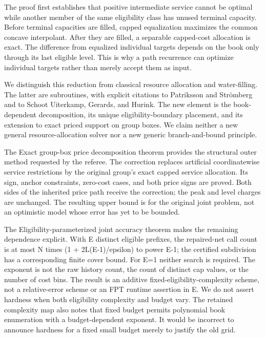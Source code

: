 \documentclass[11pt,letterpaper]{article}
\begin{document}
The proof first establishes that positive intermediate service cannot be optimal while another member of the same eligibility class has unused terminal capacity. Before terminal capacities are filled, capped equalization maximizes the common concave interpolant. After they are filled, a separable capped-cost allocation is exact. The difference from equalized individual targets depends on the book only through its last eligible level. This is why a path recurrence can optimize individual targets rather than merely accept them as input.



We distinguish this reduction from classical resource allocation and water-filling. The latter are subroutines, with explicit citations to Patriksson and Strömberg and to Schoot Uiterkamp, Gerards, and Hurink. The new element is the book-dependent decomposition, its unique eligibility-boundary placement, and its extension to exact priced support on group boxes. We claim neither a new general resource-allocation solver nor a new generic branch-and-bound principle.



The Exact group-box price decomposition theorem provides the structural outer method requested by the referee. The correction replaces artificial coordinatewise service restrictions by the original group's exact capped service allocation. Its sign, anchor constraints, zero-cost cases, and both price signs are proved. Both sides of the inherited price path receive the correction; the peak and level charges are unchanged. The resulting upper bound is for the original joint problem, not an optimistic model whose error has yet to be bounded.



The Eligibility-parameterized joint accuracy theorem makes the remaining dependence explicit. With E distinct eligible prefixes, the repaired-net call count is at most N times (1 + 2L(E-1)/epsilon) to power E-1; the certified subdivision has a corresponding finite cover bound. For E=1 neither search is required. The exponent is not the raw history count, the count of distinct cap values, or the number of cost bins. The result is an additive fixed-eligibility-complexity scheme, not a relative-error scheme or an FPT runtime assertion in E. We do not assert hardness when both eligibility complexity and budget vary. The retained complexity map also notes that fixed budget permits polynomial book enumeration with a budget-dependent exponent. It would be incorrect to announce hardness for a fixed small budget merely to justify the old grid.
\end{document}
